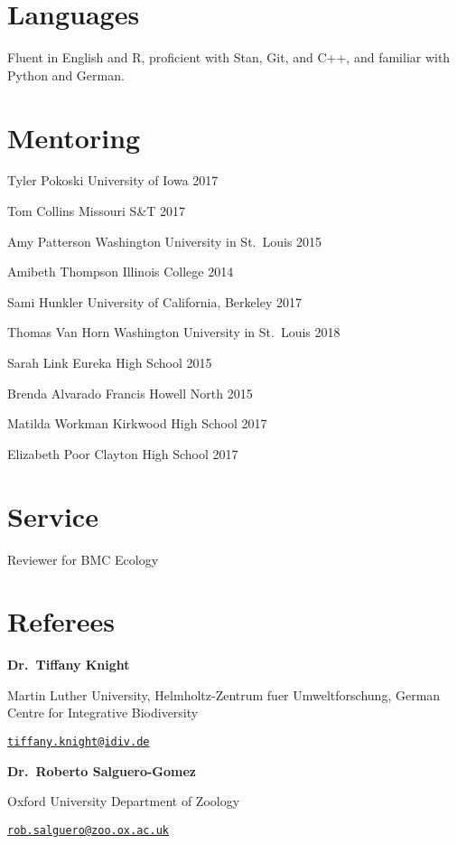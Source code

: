 \documentclass[11pt,]{article}
\begin{document}
\section{Languages}\label{languages}

Fluent in English and R, proficient with Stan, Git, and C++, and
familiar with Python and German.

\section{Mentoring}\label{mentoring}

Tyler Pokoski \hfill  University of Iowa 2017

Tom Collins \hfill Missouri S\&T 2017

Amy Patterson \hfill Washington University in St.~Louis 2015

Amibeth Thompson \hfill Illinois College 2014

Sami Hunkler \hfill University of California, Berkeley 2017

Thomas Van Horn \hfill Washington University in St.~Louis 2018

Sarah Link \hfill Eureka High School 2015

Brenda Alvarado \hfill Francis Howell North 2015

Matilda Workman \hfill Kirkwood High School 2017

Elizabeth Poor \hfill Clayton High School 2017

\section{Service}\label{service}

Reviewer for BMC Ecology

\section{Referees}\label{referees}

\textbf{Dr.~Tiffany Knight}

Martin Luther University, Helmholtz-Zentrum fuer Umweltforschung, German
Centre for Integrative Biodiversity

\href{mailto:tiffany.knight@idiv.de}{\nolinkurl{tiffany.knight@idiv.de}}

\textbf{Dr.~Roberto Salguero-Gomez}

Oxford University Department of Zoology

\href{mailto:rob.salguero@zoo.ox.ac.uk}{\nolinkurl{rob.salguero@zoo.ox.ac.uk}}
\end{document}
